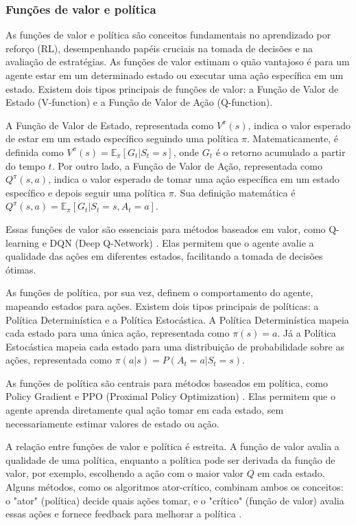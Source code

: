 \subsubsection{Funções de valor e política}
\label{subsubsec:valor_politica}

As funções de valor e política são conceitos fundamentais no aprendizado por reforço (RL), desempenhando papéis cruciais na tomada de decisões e na avaliação de estratégias. As funções de valor estimam o quão vantajoso é para um agente estar em um determinado estado ou executar uma ação específica em um estado. Existem dois tipos principais de funções de valor: a Função de Valor de Estado (V-function) e a Função de Valor de Ação (Q-function).

A Função de Valor de Estado, representada como \( V^\pi(s) \), indica o valor esperado de estar em um estado específico seguindo uma política \(\pi\). Matematicamente, é definida como \( V^\pi(s) = \mathbb{E}_\pi[G_t | S_t = s] \), onde \( G_t \) é o retorno acumulado a partir do tempo \( t \). Por outro lado, a Função de Valor de Ação, representada como \( Q^\pi(s,a) \), indica o valor esperado de tomar uma ação específica em um estado específico e depois seguir uma política \(\pi\). Sua definição matemática é \( Q^\pi(s,a) = \mathbb{E}_\pi[G_t | S_t = s, A_t = a] \).

Essas funções de valor são essenciais para métodos baseados em valor, como Q-learning e DQN (Deep Q-Network) \cite{ Liu2020OverviewOR}. Elas permitem que o agente avalie a qualidade das ações em diferentes estados, facilitando a tomada de decisões ótimas.

As funções de política, por sua vez, definem o comportamento do agente, mapeando estados para ações. Existem dois tipos principais de políticas: a Política Determinística e a Política Estocástica. A Política Determinística mapeia cada estado para uma única ação, representada como \(\pi(s) = a\). Já a Política Estocástica mapeia cada estado para uma distribuição de probabilidade sobre as ações, representada como \(\pi(a|s) = P(A_t = a | S_t = s)\).

As funções de política são centrais para métodos baseados em política, como Policy Gradient e PPO (Proximal Policy Optimization) \cite{ Liu2020OverviewOR}. Elas permitem que o agente aprenda diretamente qual ação tomar em cada estado, sem necessariamente estimar valores de estado ou ação.

A relação entre funções de valor e política é estreita. A função de valor avalia a qualidade de uma política, enquanto a política pode ser derivada da função de valor, por exemplo, escolhendo a ação com o maior valor \( Q \) em cada estado. Alguns métodos, como os algoritmos ator-crítico, combinam ambos os conceitos: o "ator" (política) decide quais ações tomar, e o "crítico" (função de valor) avalia essas ações e fornece feedback para melhorar a política \cite{ Liu2020OverviewOR}.

